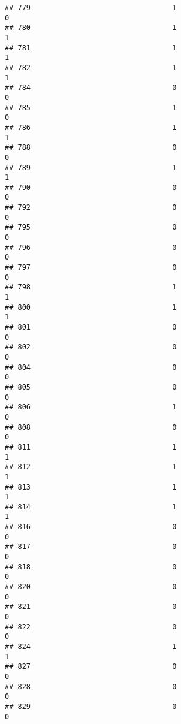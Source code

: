 \documentclass[
]{article}
\begin{document}
\begin{verbatim}
## 779                                 1                                0
## 780                                 1                                1
## 781                                 1                                1
## 782                                 1                                1
## 784                                 0                                0
## 785                                 1                                0
## 786                                 1                                1
## 788                                 0                                0
## 789                                 1                                1
## 790                                 0                                0
## 792                                 0                                0
## 795                                 0                                0
## 796                                 0                                0
## 797                                 0                                0
## 798                                 1                                1
## 800                                 1                                1
## 801                                 0                                0
## 802                                 0                                0
## 804                                 0                                0
## 805                                 0                                0
## 806                                 1                                0
## 808                                 0                                0
## 811                                 1                                1
## 812                                 1                                1
## 813                                 1                                1
## 814                                 1                                1
## 816                                 0                                0
## 817                                 0                                0
## 818                                 0                                0
## 820                                 0                                0
## 821                                 0                                0
## 822                                 0                                0
## 824                                 1                                1
## 827                                 0                                0
## 828                                 0                                0
## 829                                 0                                0

\end{verbatim}
\end{document}
